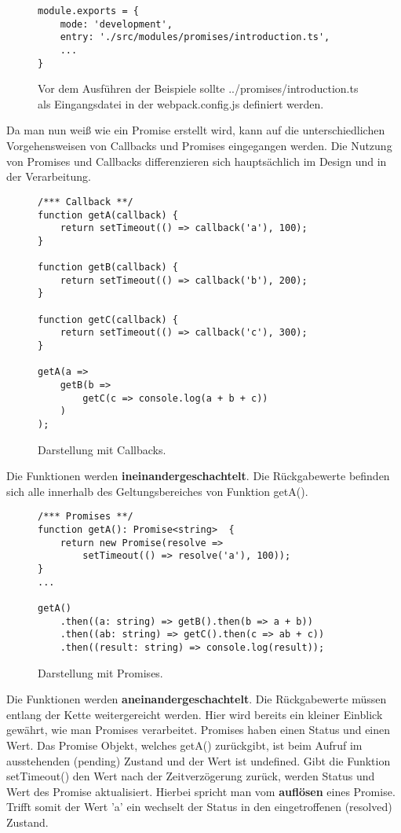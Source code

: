 \begin{figure}[H]
\begin{lstlisting}[basicstyle=\small]
module.exports = {
    mode: 'development',
    entry: './src/modules/promises/introduction.ts',
    ...
}
\end{lstlisting}
\caption{Vor dem Ausführen der Beispiele sollte ../promises/introduction.ts als Eingangsdatei in der webpack.config.js definiert werden.}
\end{figure}

\noindent
Da man nun weiß wie ein Promise erstellt wird, kann auf die unterschiedlichen Vorgehensweisen von Callbacks und Promises eingegangen werden. Die Nutzung von Promises und Callbacks differenzieren sich hauptsächlich im Design und in der Verarbeitung.

\begin{figure}[H]
\begin{lstlisting}[basicstyle=\small]
/*** Callback **/
function getA(callback) {
    return setTimeout(() => callback('a'), 100);
}

function getB(callback) {
    return setTimeout(() => callback('b'), 200);
}

function getC(callback) {
    return setTimeout(() => callback('c'), 300);
}

getA(a =>
    getB(b =>
        getC(c => console.log(a + b + c))
    )
);
\end{lstlisting}
\caption{Darstellung mit Callbacks.}
\end{figure}

\noindent
Die Funktionen werden \textbf{ineinandergeschachtelt}. Die Rückgabewerte befinden sich alle innerhalb des Geltungsbereiches von Funktion getA().

\begin{figure}[H]
\begin{lstlisting}[basicstyle=\small]
/*** Promises **/
function getA(): Promise<string>  {
    return new Promise(resolve =>
        setTimeout(() => resolve('a'), 100));
}
...

getA()
    .then((a: string) => getB().then(b => a + b))
    .then((ab: string) => getC().then(c => ab + c))
    .then((result: string) => console.log(result));
\end{lstlisting}
\caption{Darstellung mit Promises.}
\end{figure}

\noindent
Die Funktionen werden \textbf{aneinandergeschachtelt}. Die Rückgabewerte müssen entlang der Kette weitergereicht werden. Hier wird bereits ein kleiner Einblick gewährt, wie man Promises verarbeitet. Promises haben einen Status und einen Wert. Das Promise Objekt, welches getA() zurückgibt, ist beim Aufruf im ausstehenden (pending) Zustand und der Wert ist undefined. Gibt die Funktion setTimeout() den Wert nach der Zeitverzögerung zurück, werden Status und Wert des Promise aktualisiert. Hierbei spricht man vom \textbf{auflösen} eines Promise. Trifft somit der Wert 'a' ein wechselt der Status in den eingetroffenen (resolved) Zustand.

